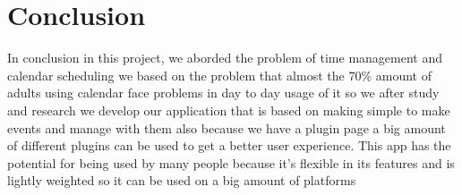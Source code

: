\section{Conclusion}
\par In conclusion in this project, we aborded the problem of time management and calendar scheduling we based on the problem that almost the 70\% amount of adults using calendar face problems in day to day usage of it so we after study and research we develop our application that is based on making simple to make events and manage with them also because we have a plugin page a big amount of different plugins can be used to get a better user experience. This app has the potential for being used by many people because it's flexible in its features and is lightly weighted so it can be used on a big amount of platforms 